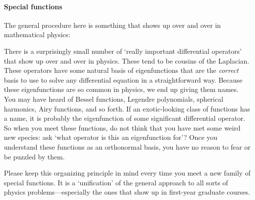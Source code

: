 \paragraph{Special functions} The general procedure here is something that shows up over and over in mathematical physics:
\begin{bigidea}\label{rule:special:functions}
There is a surprisingly small number of `really important differential operators' that show up over and over in physics. These tend to be cousins of the Laplacian. These operators have some natural basis of eigenfunctions that are the \emph{correct} basis to use to solve any differential equation in a straightforward way. Because these eigenfunctions are so common in physics, we end up giving them names. You may have heard of Bessel functions, Legendre polynomials, spherical harmonics, Airy functions, and so forth. If an exotic-looking class of functions has a name, it is probably the eigenfunction of some significant differential operator. So when you meet these functions, do not think that you have met some weird new species: ask `what operator is this an eigenfunction for'? Once you understand these functions as an orthonormal basis, you have no reason to fear or be puzzled by them. 
\end{bigidea}
Please keep this organizing principle in mind every time you meet a new family of special functions. It is a `unification' of the general approach to all sorts of physics problems---especially the ones that show up in first-year graduate courses. 


